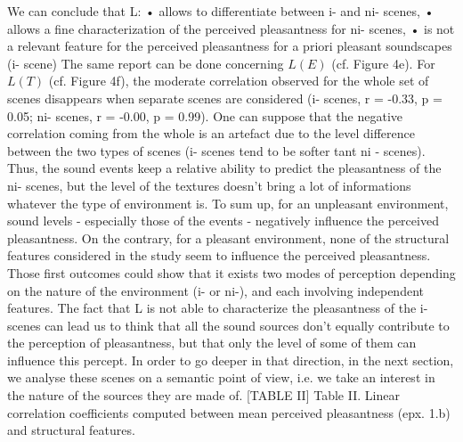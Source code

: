 We can conclude that L: • allows to differentiate between i- and ni- scenes, • allows a fine characterization of the perceived pleasantness for ni- scenes, • is not a relevant feature for the perceived pleasantness for a priori pleasant soundscapes (i- scene)
The same report can be done concerning $L(E)$ (cf. Figure 4e). For $L(T)$ (cf. Figure 4f), the moderate correlation observed for the whole set of scenes disappears when separate scenes are considered (i- scenes, r = -0.33, p = 0.05; ni- scenes, r = -0.00, p = 0.99). One can suppose that the negative correlation coming from the whole is an artefact due to the level difference between the two types of scenes (i- scenes tend to be softer tant ni - scenes). Thus, the sound events keep a relative ability to predict the pleasantness of the ni- scenes, but the level of the textures doesn’t bring a lot of informations whatever the type of environment is.
To sum up, for an unpleasant environment, sound levels - especially those of the events - negatively influence the perceived pleasantness. On the contrary, for a pleasant environment, none of the structural features considered in the study seem to influence the perceived pleasantness. Those first outcomes could show that it exists two modes of perception depending on the nature of the environment (i- or ni-), and each involving independent features. The fact that L is not able to characterize the pleasantness of the i- scenes can lead us to think that all the sound sources don’t equally contribute to the perception of pleasantness, but that only the level of some of them can influence this percept. In order to go deeper in that direction, in the next section, we analyse these scenes on a semantic point of view, i.e. we take an interest in the nature of the sources they are made of.
[TABLE II] Table II. Linear correlation coefficients computed between mean perceived pleasantness (epx. 1.b) and structural features.
